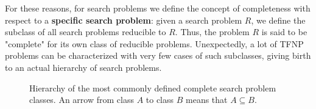For these reasons, for search problems we define the concept of completeness with respect to a \textbf{specific search problem}: given a search problem $R$, we define the subclass of all search problems reducible to $R$. Thus, the problem $R$ is said to be "complete" for its own class of reducible problems. Unexpectedly, a lot of \textsf{TFNP} problems can be characterized with very few cases of such subclasses, giving birth to an actual hierarchy of search problems.

\begin{figure}[H]
    \centering
    
    
    \caption{Hierarchy of the most commonly defined complete search problem classes. An arrow from class $A$ to class $B$ means that $A \subseteq B$.}
\end{figure}


